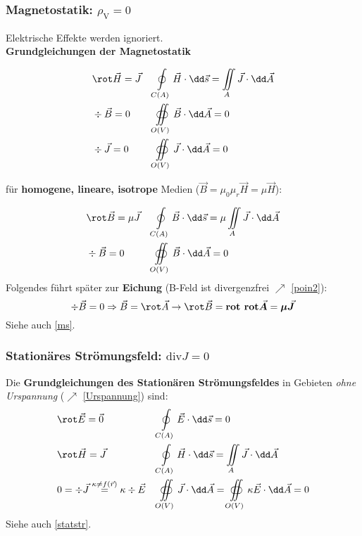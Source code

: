   \subsubsection{Magnetostatik: $\rho_{\mathrm{V}}= 0$}
Elektrische Effekte werden ignoriert.\\
	  \textbf{Grundgleichungen der Magnetostatik}

	  \begin{align}
		   & \rot \vec{H}= \vec{J} &  & \oint\limits_{C(A)}\vec{H}\cdot \dd\vec{s}= \iint\limits_{A}\vec{J}\cdot \dd\vec{A} \label{GGms1} \\
		   & \div \vec{B}= 0       &  & \oiint\limits_{O(V)}\vec{B}\cdot \dd\vec{A}= 0                                   \label{GGms2}   \\
		   & \div \vec{J}= 0       &  & \oiint\limits_{O(V)}\vec{J}\cdot \dd\vec{A}= 0
	  \end{align}

	  für \textbf{homogene, lineare, isotrope} Medien ($\vec{B}=\mu_{0}\mu_{r} \vec{H}
		  =\mu \vec{H}$):

	  \begin{align}
		   & \rot \vec{B}= \mu\vec{J} &  & \oint\limits_{C(A)}\vec{B}\cdot \dd\vec{s}= \mu\iint\limits_{A}\vec{J}\cdot \dd\vec{A} \\
		   & \div \vec{B}= 0          &  & \oiint\limits_{O(V)}\vec{B}\cdot \dd\vec{A}= 0
	  \end{align}
	  Folgendes führt später zur \textbf{Eichung} (B-Feld ist divergenzfrei $\nearrow$ \ref{poin2}):
\begin{equation}
		  \div \vec{B}= 0 \Rightarrow \vec{B}= \rot \vec{A}\to \rot \vec{B}= \textbf{rot rot}\vec{\bm{A}}= \bm{\mu}\vec{\bm{J}}\end{equation} 
		  Siehe auch \ref{ms}.
	  \subsubsection{Stationäres Strömungsfeld: $\mathrm{div}{J}= 0$}
	   Die \textbf{Grundgleichungen des Stationären Strömungsfeldes} in Gebieten \textit{ohne Urspannung} ($\nearrow$ \ref{Urspannung}) sind:
		  { \begin{align}&\rot \vec{E}= \vec{0}&&\oint\limits_{C(A)}\vec{E}\cdot \dd\vec{s}= 0\label{GGstatstr1}\\&\rot \vec{H}= \vec{J}&&\oint\limits_{C(A)}\vec{H}\cdot \dd\vec{s}= \iint\limits_{A}\vec{J}\cdot \dd\vec{A}\\&0=\div \vec{J}\stackrel{\kappa\neq f(\vec{r})}{=} \kappa\div \vec{E}&&\oiint\limits_{O(V)}\vec{J}\cdot \dd\vec{A}= \oiint\limits_{O(V)}\kappa\vec{E}\cdot \dd\vec{A}= 0\label{GGstatstr3}\end{align} }
			   Siehe auch \ref{statstr}.

